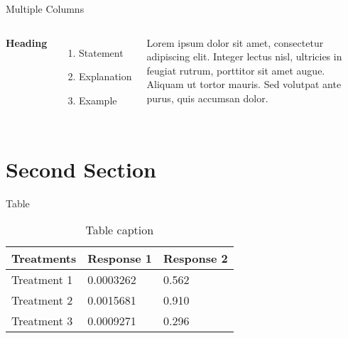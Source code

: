 \documentclass[aspectratio=169,xcolor=dvipsnames]{beamer}
\begin{document}

\begin{frame}{Multiple Columns}
    \begin{columns}[c] %

        \textbf{Heading}
        \begin{enumerate}
            \item Statement
            \item Explanation
            \item Example
        \end{enumerate}

        Lorem ipsum dolor sit amet, consectetur adipiscing elit. Integer lectus nisl, ultricies in feugiat rutrum, porttitor sit amet augue. Aliquam ut tortor mauris. Sed volutpat ante purus, quis accumsan dolor.

    \end{columns}
\end{frame}

\section{Second Section}

\begin{frame}{Table}
    \begin{table}
        \begin{tabular}{l l l}
            \toprule
            \textbf{Treatments} & \textbf{Response 1} & \textbf{Response 2} \\
            \midrule
            Treatment 1         & 0.0003262           & 0.562               \\
            Treatment 2         & 0.0015681           & 0.910               \\
            Treatment 3         & 0.0009271           & 0.296               \\
            \bottomrule
        \end{tabular}
        \caption{Table caption}
    \end{table}
\end{frame}

\end{document}
